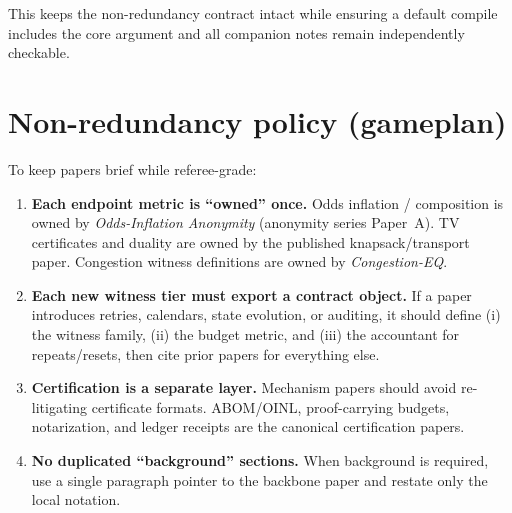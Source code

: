 \documentclass[11pt]{article}
\begin{document}
This keeps the non-redundancy contract intact while ensuring a default compile includes the core argument and all companion notes remain independently checkable.

\section{Non-redundancy policy (gameplan)}
To keep papers brief while referee-grade:
\begin{enumerate}[leftmargin=*]
\item \textbf{Each endpoint metric is ``owned'' once.}
  Odds inflation / composition is owned by \emph{Odds-Inflation Anonymity} (anonymity series Paper~A).
  TV certificates and duality are owned by the published knapsack/transport paper.
  Congestion witness definitions are owned by \emph{Congestion-EQ}.
\item \textbf{Each new witness tier must export a contract object.}
  If a paper introduces retries, calendars, state evolution, or auditing, it should define (i) the witness family, (ii) the budget metric, and (iii) the accountant for repeats/resets,
  then cite prior papers for everything else.
\item \textbf{Certification is a separate layer.}
  Mechanism papers should avoid re-litigating certificate formats.
  ABOM/OINL, proof-carrying budgets, notarization, and ledger receipts are the canonical certification papers.
\item \textbf{No duplicated ``background'' sections.}
  When background is required, use a single paragraph pointer to the backbone paper and restate only the local notation.
\end{enumerate}
\end{document}
